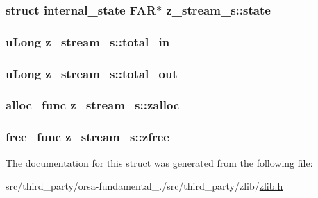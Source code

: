 \subsubsection[{state}]{\setlength{\rightskip}{0pt plus 5cm}struct {\bf internal\+\_\+state} {\bf F\+A\+R}$\ast$ z\+\_\+stream\+\_\+s\+::state}\label{structz__stream__s_ac4a114217a1868dc6fbe7d1f5bda126b}
\hypertarget{structz__stream__s_aa8f408b9632737dc21519fa1ed34b08d}{}
\subsubsection[{total\+\_\+in}]{\setlength{\rightskip}{0pt plus 5cm}u\+Long z\+\_\+stream\+\_\+s\+::total\+\_\+in}\label{structz__stream__s_aa8f408b9632737dc21519fa1ed34b08d}
\hypertarget{structz__stream__s_abae26f1f236cf920250b9d37fdf009c1}{}
\subsubsection[{total\+\_\+out}]{\setlength{\rightskip}{0pt plus 5cm}u\+Long z\+\_\+stream\+\_\+s\+::total\+\_\+out}\label{structz__stream__s_abae26f1f236cf920250b9d37fdf009c1}
\hypertarget{structz__stream__s_a23a2299c384f808e76e9908f21216b0f}{}
\subsubsection[{zalloc}]{\setlength{\rightskip}{0pt plus 5cm}alloc\+\_\+func z\+\_\+stream\+\_\+s\+::zalloc}\label{structz__stream__s_a23a2299c384f808e76e9908f21216b0f}
\hypertarget{structz__stream__s_a89eb750ade7f4f0b56bfdadf13344982}{}
\subsubsection[{zfree}]{\setlength{\rightskip}{0pt plus 5cm}free\+\_\+func z\+\_\+stream\+\_\+s\+::zfree}\label{structz__stream__s_a89eb750ade7f4f0b56bfdadf13344982}


The documentation for this struct was generated from the following file\+:\begin{DoxyCompactItemize}
\item 
src/third\+\_\+party/orsa-\/fundamental\+\_./src/third\+\_\+party/zlib/\hyperlink{zlib_8h}{zlib.\+h}\end{DoxyCompactItemize}
